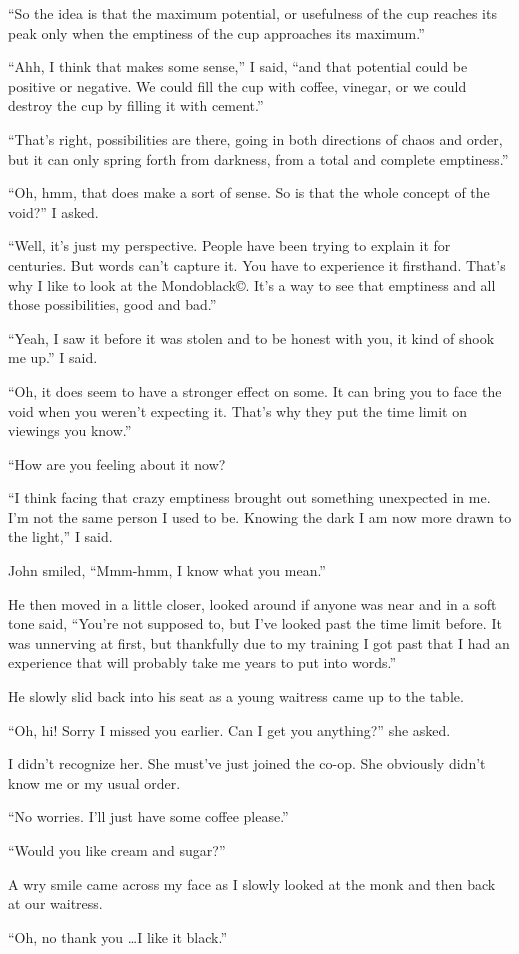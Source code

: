 ``So the idea is that the maximum potential, or usefulness of
the cup reaches its peak only when the emptiness of the cup
approaches its maximum.''

``Ahh, I think that makes some sense,'' I said, ``and that
potential could be positive or negative. We could fill the cup
with coffee, vinegar, or we could destroy the cup by filling it
with cement.''

``That's right, possibilities are there, going in both
directions of chaos and order, but it can only spring forth
from darkness, from a total and complete emptiness.''

``Oh, hmm, that does make a sort of sense. So is that the whole
concept of the void?'' I asked.

``Well, it's just my perspective. People have been trying to
explain it for centuries. But words can't capture it. You have
to experience it firsthand.  That's why I like to look at the
Mondoblack\copyright. It's a way to see
that emptiness and all those possibilities, good and bad.''

``Yeah, I saw it before it was stolen and to be honest with you,
it kind of shook me up.'' I said.

``Oh, it does seem to have a stronger effect on some. It can
bring you to face the void when you weren't expecting
it. That's why they put the time limit on viewings you know.''

``How are you feeling about it now?

``I think facing that crazy emptiness brought out
something unexpected in me. I'm not the same person I used to
be. Knowing the dark I am now more drawn to the light,'' I said.

John smiled, ``Mmm-hmm, I know what you mean.''

He then moved in a little closer, looked around if anyone was
near and in a soft tone said, ``You're not supposed to, but
I've looked past the time limit before. It was unnerving at
first, but thankfully due to my training I got past that I had
an experience that will probably take me years to put into words.''

He slowly slid back into his seat as a young waitress came up
to the table.

``Oh, hi! Sorry I missed you earlier. Can I get
you anything?'' she asked.

I didn't recognize her. She must've just joined the co-op.
She obviously didn't know me or my usual order.

``No worries. I'll just have some coffee please.''

``Would you like cream and sugar?''

A wry smile came across my face as I slowly looked at the monk
and then back at our waitress.

``Oh, no thank you \ldots I like it black.''

\newpage



